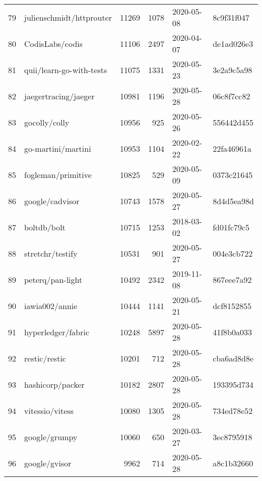 \begin{longtable}{llrrll}
    79  &                           julienschmidt/httprouter &  11269 &   1078 & 2020-05-08 &  8c9f31f047 \\
    80  &                                    CodisLabs/codis &  11106 &   2497 & 2020-04-07 &  de1ad026e3 \\
    81  &                           quii/learn-go-with-tests &  11075 &   1331 & 2020-05-23 &  3e2a9c5a98 \\
    82  &                               jaegertracing/jaeger &  10981 &   1196 & 2020-05-28 &  06c8f7cc82 \\
    83  &                                      gocolly/colly &  10956 &    925 & 2020-05-26 &  556442d455 \\
    84  &                                 go-martini/martini &  10953 &   1104 & 2020-02-22 &  22fa46961a \\
    85  &                                 fogleman/primitive &  10825 &    529 & 2020-05-09 &  0373c21645 \\
    86  &                                    google/cadvisor &  10743 &   1578 & 2020-05-27 &  8d4d5ea98d \\
    87  &                                        boltdb/bolt &  10715 &   1253 & 2018-03-02 &  fd01fc79c5 \\
    88  &                                   stretchr/testify &  10531 &    901 & 2020-05-27 &  004e3cb722 \\
    89  &                                   peterq/pan-light &  10492 &   2342 & 2019-11-08 &  867eee7a92 \\
    90  &                                     iawia002/annie &  10444 &   1141 & 2020-05-21 &  dcf8152855 \\
    91  &                                 hyperledger/fabric &  10248 &   5897 & 2020-05-28 &  41f8b0a033 \\
    92  &                                      restic/restic &  10201 &    712 & 2020-05-28 &  cba6ad8d8e \\
    93  &                                   hashicorp/packer &  10182 &   2807 & 2020-05-28 &  193395d734 \\
    94  &                                    vitessio/vitess &  10080 &   1305 & 2020-05-28 &  734ed78e52 \\
    95  &                                      google/grumpy &  10060 &    650 & 2020-03-27 &  3ec8795918 \\
    96  &                                      google/gvisor &   9962 &    714 & 2020-05-28 &  a8c1b32660 \\

\end{longtable}
